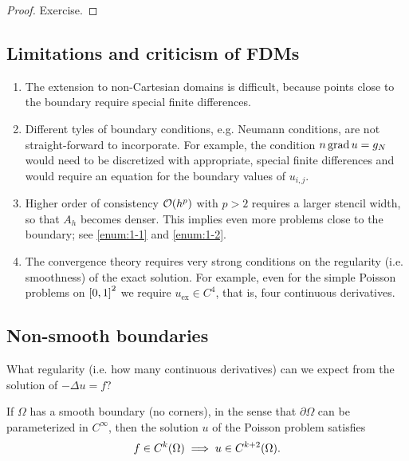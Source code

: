 \begin{proof}
	Exercise.
\end{proof}


\subsection{Limitations and criticism of FDMs}

\begin{enumerate}
	\item\label{enum:1-1} The extension to non-Cartesian domains is difficult, because points close to the boundary require special finite differences.
	\item\label{enum:1-2} Different tyles of boundary conditions, e.g. Neumann conditions, are not straight-forward to incorporate.
	For example, the condition \(n\grad u = g_N\) would need to be discretized with appropriate, special finite differences and would require an equation for the boundary values of \(u_{i, j}\).
	\item Higher order of consistency \(\mathcal{O}\parentheses*{h^p}\) with \(p > 2\) requires a larger stencil width, so that \(A_h\) becomes denser.
	This implies even more problems close to the boundary; see \ref{enum:1-1} and \ref{enum:1-2}.
	\item The convergence theory requires very strong conditions on the regularity (i.e. smoothness) of the exact solution.
	For example, even for the simple Poisson problems on \(\brackets*{0, 1}^2\) we require \(u_{\text{ex}} \in C^4\), that is, four continuous derivatives.
\end{enumerate}


\subsection{Non-smooth boundaries}

What regularity (i.e. how many continuous derivatives) can we expect from the solution of \(-\Delta u = f\)?

\begin{theorem}
	If \(\Omega\) has a smooth boundary (no corners), in the sense that \(\partial\Omega\) can be parameterized in \(C^\infty\), then the solution \(u\) of the Poisson problem satisfies
	\[
		f \in C^k\parentheses*{\Omega} \implies u \in C^{k + 2}\parentheses*{\Omega}.
	\]
\end{theorem}

